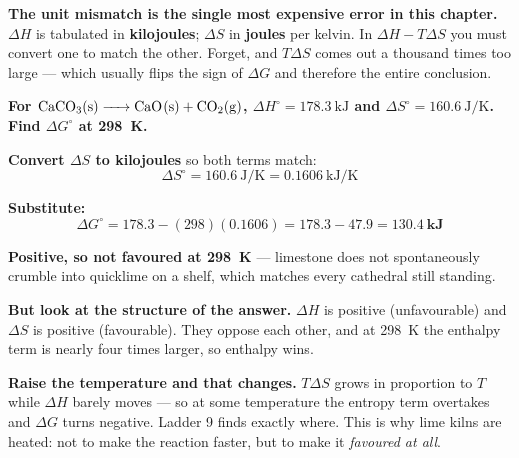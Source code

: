 \documentclass{apchem-worksheet}
\begin{document}
\begin{center}
\end{center}

\begin{apctrap}
\textbf{The unit mismatch is the single most expensive error in this
chapter.} $\Delta H$ is tabulated in \textbf{kilojoules};
$\Delta S$ in \textbf{joules} per kelvin. In $\Delta H - T\Delta S$ you
must convert one to match the other. Forget, and $T\Delta S$ comes out a
thousand times too large --- which usually flips the sign of $\Delta G$
and therefore the entire conclusion.
\end{apctrap}

\begin{workedexample}
\textbf{For $\ce{CaCO3(s) -> CaO(s) + CO2(g)}$, $\Delta H^{\circ} =
\SI{+178.3}{\kilo\joule}$ and $\Delta S^{\circ} =
\SI{+160.6}{\joule\per\kelvin}$. Find $\Delta G^{\circ}$ at
\SI{298}{\kelvin}.}

\textbf{Convert $\Delta S$ to kilojoules} so both terms match:
\[ \Delta S^{\circ} = \SI{160.6}{\joule\per\kelvin}
   = \SI{0.1606}{\kilo\joule\per\kelvin} \]

\textbf{Substitute:}
\[ \Delta G^{\circ} = 178.3 - (298)(0.1606)
   = 178.3 - 47.9 = \mathbf{\SI{+130.4}{\kilo\joule}} \]

\textbf{Positive, so not favoured at \SI{298}{\kelvin}} --- limestone
does not spontaneously crumble into quicklime on a shelf, which
matches every cathedral still standing.

\textbf{But look at the structure of the answer.} $\Delta H$ is
positive (unfavourable) and $\Delta S$ is positive (favourable). They
oppose each other, and at \SI{298}{\kelvin} the enthalpy term is nearly
four times larger, so enthalpy wins.

\textbf{Raise the temperature and that changes.} $T\Delta S$ grows in
proportion to $T$ while $\Delta H$ barely moves --- so at some
temperature the entropy term overtakes and $\Delta G$ turns negative.
Ladder 9 finds exactly where. This is why lime kilns are heated: not to
make the reaction faster, but to make it \emph{favoured at all}.
\end{workedexample}
\end{document}
